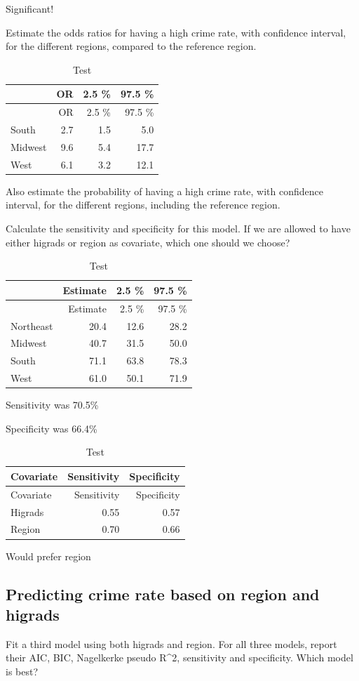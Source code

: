 \documentclass[a4paper]{article}
\begin{document}
Significant!

Estimate the odds ratios for having a high crime rate, with confidence
interval, for the different regions, compared to the reference region.

\begin{longtable}[]{@{}lrrr@{}}
\caption{Test}\tabularnewline
\toprule
& OR & 2.5 \% & 97.5 \%\tabularnewline
\midrule
\endfirsthead
\toprule
& OR & 2.5 \% & 97.5 \%\tabularnewline
\midrule
\endhead
South & 2.7 & 1.5 & 5.0\tabularnewline
Midwest & 9.6 & 5.4 & 17.7\tabularnewline
West & 6.1 & 3.2 & 12.1\tabularnewline
\bottomrule
\end{longtable}

Also estimate the probability of having a high crime rate, with
confidence interval, for the different regions, including the reference
region.

Calculate the sensitivity and specificity for this model. If we are
allowed to have either higrads or region as covariate, which one should
we choose?

\begin{longtable}[]{@{}lrrr@{}}
\caption{Test}\tabularnewline
\toprule
& Estimate & 2.5 \% & 97.5 \%\tabularnewline
\midrule
\endfirsthead
\toprule
& Estimate & 2.5 \% & 97.5 \%\tabularnewline
\midrule
\endhead
Northeast & 20.4 & 12.6 & 28.2\tabularnewline
Midwest & 40.7 & 31.5 & 50.0\tabularnewline
South & 71.1 & 63.8 & 78.3\tabularnewline
West & 61.0 & 50.1 & 71.9\tabularnewline
\bottomrule
\end{longtable}

Sensitivity was 70.5\%

Specificity was 66.4\%

\begin{longtable}[]{@{}lrr@{}}
\caption{Test}\tabularnewline
\toprule
Covariate & Sensitivity & Specificity\tabularnewline
\midrule
\endfirsthead
\toprule
Covariate & Sensitivity & Specificity\tabularnewline
\midrule
\endhead
Higrads & 0.55 & 0.57\tabularnewline
Region & 0.70 & 0.66\tabularnewline
\bottomrule
\end{longtable}

Would prefer region

\subsection{Predicting crime rate based on region and
higrads}\label{predicting-crime-rate-based-on-region-and-higrads}

Fit a third model using both higrads and region. For all three models,
report their AIC, BIC, Nagelkerke pseudo R\^{}2, sensitivity and
specificity. Which model is best?
\end{document}
